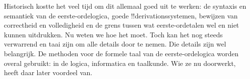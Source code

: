 \documentclass[openany]{memoir}
\begin{document}
Historisch kostte het veel tijd om dit allemaal goed uit te werken:
de syntaxis en semantiek van de eerste-ordelogica, goede
!!{derivation}ssystemen, bewijzen van correctheid en volledigheid en de
grens tussen wat eerste-ordetalen wel en niet kunnen uitdrukken. Nu
weten we hoe het moet. Toch kan het nog steeds verwarrend en taai zijn
om alle details door te nemen. Die details zijn wel belangrijk. De
methoden voor de formele taal van de eerste-ordelogica worden overal
gebruikt: in de logica, informatica en taalkunde. Wie ze nu doorwerkt,
heeft daar later voordeel van.
\endgroup
\OLEndChapterHook

\begingroup
\def\olfilename{OLP-0149}
\def\olfilepath{content/first-order-logic/syntax-and-semantics/}
\hypertarget{unit-OLP-0149}{}



\endgroup

\begingroup
\def\olfilename{OLP-0150}
\def\olfilepath{content/first-order-logic/syntax-and-semantics/}
\hypertarget{unit-OLP-0150}{}




\end{document}

